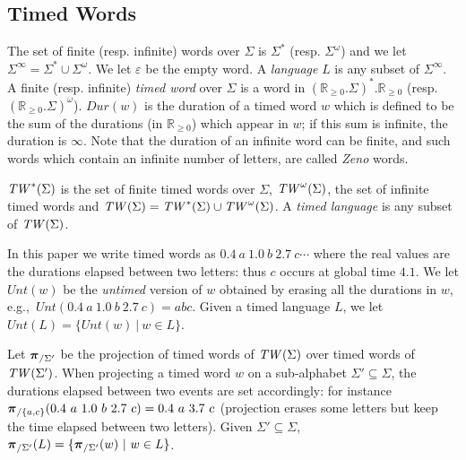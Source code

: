 \documentclass[letterpaper,10pt,conference]{ieeeconf}  \IEEEoverridecommandlockouts                              \overrideIEEEmargins
\def\eg{{e.g.},~}
\newcommand{\setR}{\mathbb R}
\newcommand{\dur}{{\textit{Dur}}} \def\inv{\textit{Inv}}
\def\tw{\textit{TW\/}}
\def\untimed{\textit{Unt}} \def\dta{DTA\xspace}
\begin{document}
\subsection{Timed Words}
The set of finite (resp. infinite) words over $\Sigma$ is $\Sigma^*$
(resp. $\Sigma^\omega$) and we let $\Sigma^\infty=\Sigma^* \cup \Sigma
^\omega$. We let $\varepsilon$ be the empty word. A \emph{language}
$L$ is any subset of $\Sigma^\infty$. A finite (resp. infinite)
\emph{timed word} over $\Sigma$ is a word in $(\setR_{\geq
  0}.\Sigma)^*.\setR_{\geq 0}$ (resp. $(\setR_{\geq
  0}.\Sigma)^\omega$).  $\dur(w)$ is the duration of a timed word $w$
which is defined to be the sum of the durations (in $\setR_{\geq 0}$)
which appear in $w$; if this sum is infinite, the duration is
$\infty$.  Note that the duration of an infinite word can be finite,
and such words which contain an infinite number of letters, are called
\emph{Zeno} words.

$\tw^*(\Sigma)$ is the set of finite timed words over $\Sigma$,
$\tw^\omega(\Sigma)$, the set of infinite timed words and
$\tw(\Sigma)=\tw^*(\Sigma) \cup \tw^\omega(\Sigma)$. A \emph{timed
  language} is any subset of $\tw(\Sigma)$. 

In this paper we write timed words as $0.4\ a\ 1.0\ b\ 2.7 \ c \cdots$
where the real values are the durations elapsed between two letters:
thus $c$ occurs at global time $4.1$. 
We let $\untimed(w)$ be the \emph{untimed} ver\-sion of $w$ ob\-tai\-ned by
erasing all the durations in $w$,
\eg $\untimed(0.4\ a\ 1.0\ b\ 2.7 \
c)=abc$.
Given a timed language $L$, we
let $\untimed(L)=\{ \untimed(w) \ | \ w \in L \}$.

Let $\boldsymbol{\pi}_{/\Sigma'}$ be the projection of timed words of $\tw(\Sigma)$
over timed words of $\tw(\Sigma')$.  When projecting a timed word $w$
on a sub-alphabet $\Sigma' \subseteq \Sigma$, the durations elap\-sed
bet\-ween two events are set accordingly: for instance
$\boldsymbol{\pi}_{/\{a,c\}}(0.4 \ a\ 1.0\ b\ 2.7 \ c )=0.4 \ a \ 3.7 \ c$
(projection erases some letters but keep the time elapsed between two
letters).    Given $\Sigma' \subseteq \Sigma$,
$\proj{\Sigma'}(L)=\{ \proj{\Sigma'}(w) \ | \ w \in L\}$.
\end{document}
